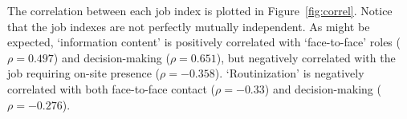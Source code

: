 The correlation between each job index is plotted in Figure~\ref{fig:correl}. Notice that the job indexes are not perfectly mutually independent. As might be expected, `information content' is positively correlated with `face-to-face' roles ($\rho=0.497$) and decision-making ($\rho=0.651$), but negatively correlated with the job requiring on-site presence ($\rho=-0.358$). `Routinization' is negatively correlated with both face-to-face contact ($\rho=-0.33$) and decision-making ($\rho=-0.276$).

